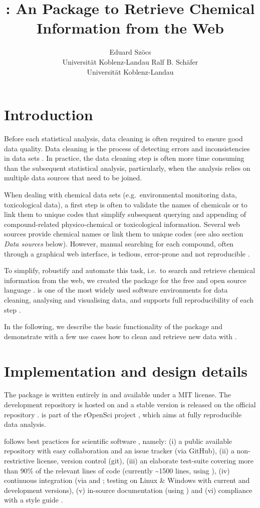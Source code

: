 \documentclass[article, shortnames]{jss}\usepackage[]{graphicx}\usepackage[]{color}
\author{Eduard Sz\"ocs\\Universit\"at Koblenz-Landau \And 
        Ralf B. Sch\"afer\\Universit\"at Koblenz-Landau}
\title{\pkg{webchem}: An \proglang{R} Package to Retrieve Chemical Information from the Web}
\begin{document}
\section[Introduction]{Introduction}
Before each statistical analysis, data cleaning is often required to ensure good data quality.
Data cleaning is the process of detecting errors and inconsistencies in data sets \citep{Chapman_2005}.
In practice, the data cleaning step is often more time consuming than the subsequent statistical analysis, particularly, when the analysis relies on multiple data sources that need to be joined.

When dealing with chemical data sets (e.g.\ environmental monitoring data, toxicological data), a first step is often to validate the names of chemicals or to link them to unique codes that simplify subsequent querying and appending of compound-related physico-chemical or toxicological information.
Several web sources provide chemical names or link them to unique codes (see also section \emph{Data sources} below).
However, manual searching for each compound, often through a graphical web interface, is tedious, error-prone and not reproducible \citep{Peng_2009}.

To simplify, robustify and automate this task, i.e.\ to search and retrieve chemical information from the web, we created the  package for the free and open source  language \citep{r_2015, Wehrens_2011}.
 is one of the most widely used software environments for data cleaning, analysing and visualising data, and supports full reproducibility of each step \citep{Marwick_2016}.

In the following, we describe the basic functionality of the package and demonstrate with a few use cases how to clean and retrieve new data with .


\section[Implementation and design details]{Implementation and design details}
The  package is written entirely in  and available under a MIT license.
The development repository is hosted on \citet{github} and a stable version is released on the official  repository \citep{cran}.
 is part of the rOpenSci project \citep{boettiger2015building}, which aims at fully reproducible data analysis.

 follows best practices for scientific software \citep{wilson_best_2014, poisot_best_2015}, namely: (i) a public available repository with easy collaboration and an issue tracker (via GitHub), (ii) a non-restrictive license, version control (git), (iii) an elaborate test-suite covering more than 90\% of the relevant lines of code (currently \textasciitilde 1500 lines, using  \citep{wickham_testthat:_2011}), (iv) continuous integration (via \citet{travis-ci} and \citet{appveyor}; testing on Linux \& Windows with current and development  versions), (v) in-source documentation (using  \citep{wickham_roxygen2:_2015}) and (vi) compliance with a style guide \citep{wickham_advanced_2015}.
\end{document}
